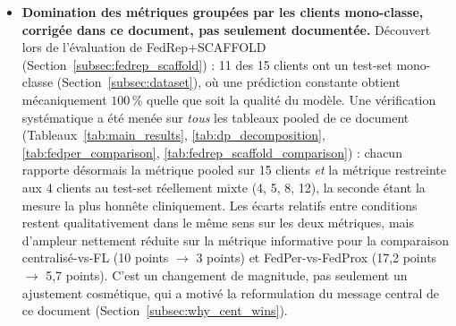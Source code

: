 \documentclass{article}
\begin{document}
\begin{itemize}
  d'ordre de mélange non contrôlé masquait un effet réel mais petit. Le test de
  Wilcoxon apparié plafonne à $p=0{,}0625$ sur les quatre comparaisons, un artefact de
  plancher propre à $n=5$ paires de même signe, pas une significativité douteuse.
  \item \textbf{Domination des métriques groupées par les clients mono-classe,
  corrigée dans ce document, pas seulement documentée.} Découvert lors de l'évaluation de
  FedRep+SCAFFOLD (Section~\ref{subsec:fedrep_scaffold}) : 11 des 15 clients ont un
  test-set mono-classe (Section~\ref{subsec:dataset}), où une prédiction constante
  obtient mécaniquement $100\,\%$ quelle que soit la qualité du modèle. Une
  vérification systématique a été menée sur \emph{tous} les tableaux pooled de ce
  document (Tableaux~\ref{tab:main_results}, \ref{tab:dp_decomposition},
  \ref{tab:fedper_comparison}, \ref{tab:fedrep_scaffold_comparison}) : chacun rapporte
  désormais la métrique pooled sur 15 clients \emph{et} la métrique restreinte aux 4
  clients au test-set réellement mixte (4, 5, 8, 12), la seconde étant la mesure la
  plus honnête cliniquement. Les écarts relatifs entre conditions restent
  qualitativement dans le même sens sur les deux métriques, mais d'ampleur nettement
  réduite sur la métrique informative pour la comparaison centralisé-vs-FL (10 points
  $\to$ 3 points) et FedPer-vs-FedProx (17,2 points $\to$ 5,7 points). C'est un changement
  de magnitude, pas seulement un ajustement cosmétique, qui a motivé la reformulation du
  message central de ce document (Section~\ref{subsec:why_cent_wins}).
\end{itemize}

\printbibliography
\end{document}
